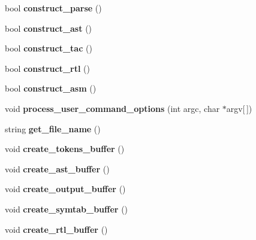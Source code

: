 \begin{DoxyCompactItemize}
bool {\bfseries construct\+\_\+parse} ()
\item 
\mbox{\label{classUser__Options_ae6450be39d4e7249e654cfa27417bdb9}} 
bool {\bfseries construct\+\_\+ast} ()
\item 
\mbox{\label{classUser__Options_aa841bc78e3d1ce12980ad68db26df52f}} 
bool {\bfseries construct\+\_\+tac} ()
\item 
\mbox{\label{classUser__Options_a185f3077d951f9ba9a150408ca911246}} 
bool {\bfseries construct\+\_\+rtl} ()
\item 
\mbox{\label{classUser__Options_a24a636e5c58b0910b7bf719ec1f8ef7c}} 
bool {\bfseries construct\+\_\+asm} ()
\item 
\mbox{\label{classUser__Options_a62c67f60171ef0a79f4576ebe62206e9}} 
void {\bfseries process\+\_\+user\+\_\+command\+\_\+options} (int argc, char $\ast$argv\mbox{[}$\,$\mbox{]})
\item 
\mbox{\label{classUser__Options_a481061a14a4438267fac95117bc07221}} 
string {\bfseries get\+\_\+file\+\_\+name} ()
\item 
\mbox{\label{classUser__Options_aeb81576ac49455b604dfb46f407a86c9}} 
void {\bfseries create\+\_\+tokens\+\_\+buffer} ()
\item 
\mbox{\label{classUser__Options_a98c25f62014bb146fdb5025d28f454d4}} 
void {\bfseries create\+\_\+ast\+\_\+buffer} ()
\item 
\mbox{\label{classUser__Options_a124b3dd6bb349a05087a11388ccbdbce}} 
void {\bfseries create\+\_\+output\+\_\+buffer} ()
\item 
\mbox{\label{classUser__Options_a8cf8ec3f1b4dc52e2a46693f464ae030}} 
void {\bfseries create\+\_\+symtab\+\_\+buffer} ()
\item 
\mbox{\label{classUser__Options_a5ffa9df3372f7a7a5e0381ecb448c98c}} 
void {\bfseries create\+\_\+rtl\+\_\+buffer} ()

\end{DoxyCompactItemize}
